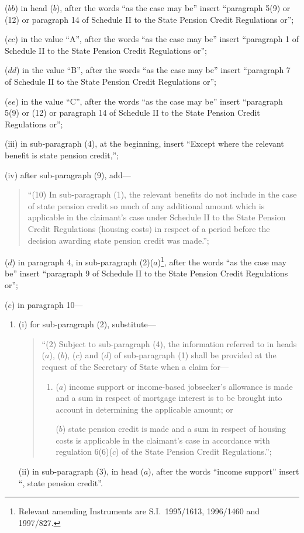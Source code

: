 \documentclass[12pt,a4paper]{article}
\begin{document}
\begin{enumerate}
\begin{enumerate}
\begin{enumerate}
($bb$) in head ($b$), after the words “as the case may be” insert “paragraph 5(9) or (12) or paragraph 14 of Schedule II to the State Pension Credit Regulations or”;

($cc$) in the value “A”, after the words “as the case may be” insert “paragraph 1 of Schedule II to the State Pension Credit Regulations or”;

($dd$) in the value “B”, after the words “as the case may be” insert “paragraph 7 of Schedule II to the State Pension Credit Regulations or”;

($ee$) in the value “C”, after the words “as the case may be” insert “paragraph 5(9) or (12) or paragraph 14 of Schedule II to the State Pension Credit Regulations or”;
\end{enumerate}

(iii) in sub-paragraph (4), at the beginning, insert “Except where the relevant benefit is state pension credit,”;

(iv) after sub-paragraph (9), add—
\begin{quotation}
“(10) In sub-paragraph (1), the relevant benefits do not include in the case of state pension credit so much of any additional amount which is applicable in the claimant’s case under Schedule II to the State Pension Credit Regulations (housing costs) in respect of a period before the decision awarding state pension credit was made.”;
\end{quotation}
\end{enumerate}

($d$) in paragraph 4, in sub-paragraph (2)($a$)\footnote{Relevant amending Instruments are S.I.\ 1995/1613, 1996/1460 and 1997/827.}, after the words “as the case may be” insert “paragraph 9 of Schedule II to the State Pension Credit Regulations or”;

($e$) in paragraph 10—
\begin{enumerate}\item[]
(i) for sub-paragraph (2), substitute—
\begin{quotation}
“(2) Subject to sub-paragraph (4), the information referred to in heads ($a$), ($b$), ($c$)  and ($d$)  of sub-paragraph (1) shall be provided at the request of the Secretary of State when a claim for—
\begin{enumerate}\item[]
($a$) income support or income-based jobseeker’s allowance is made and a sum in respect of mortgage interest is to be brought into account in determining the applicable amount; or

($b$) state pension credit is made and a sum in respect of housing costs is applicable in the claimant’s case in accordance with regulation 6(6)($c$)  of the State Pension Credit Regulations.”;
\end{enumerate}
\end{quotation}

(ii) in sub-paragraph (3), in head ($a$), after the words “income support” insert “, state pension credit”.
\end{enumerate}
\end{enumerate}
\end{document}
